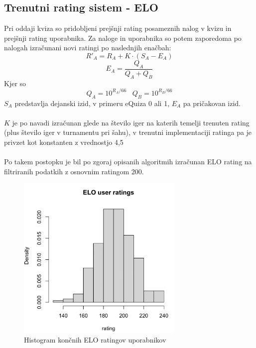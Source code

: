 \documentclass{IEEEtran}
\makeatletter
\let\old@subsection\subsection
\renewcommand{\subsection}[1]{\bigskip\old@subsection{#1}\@afterindentfalse\@afterheading}
\makeatother
\begin{document}
\subsection{Trenutni rating sistem - ELO}
Pri oddaji kviza so pridobljeni prejšnji rating posameznih nalog v kvizu in prejšnji rating uporabnika. Za naloge in uporabnika so potem zaporedoma po nalogah izračunani novi ratingi po naslednjih enačbah:
\begin{equation}
    R'_{A}=R_{A}+K\cdot \left ( S_{A}-E_{A} \right )
\end{equation}
\begin{equation}
    E_{A}=\frac{Q_{A}}{Q_{A}+Q_{B}}
\end{equation}
Kjer so
\begin{equation}
    Q_{A}=10^{R_{A}/66}\;\;\;Q_{B}=10^{R_{B}/66}
\end{equation}
$S_{A}$ predstavlja dejanski izid, v primeru eQuiza 0 ali 1, $E_{A}$ pa pričakovan izid.
\hfill
\\
\\
$K$ je po navadi izračunan glede na število iger na katerih temelji trenuten rating (plus število iger v turnamentu pri šahu),
v trenutni implementaciji ratinga pa je privzet kot konstanten z vrednostjo 4,5
\hfill
\\
\\
Po takem postopku je bil po zgoraj opisanih algoritmih izračunan ELO rating na filtriranih podatkih z osnovnim ratingom 200.
\begin{figure}[h!]
    \includegraphics[width=8cm]{ComputedELO}
    \caption{Histogram končnih ELO ratingov uporabnikov}%
    \label{fig:example}%
\end{figure}
\end{document}
